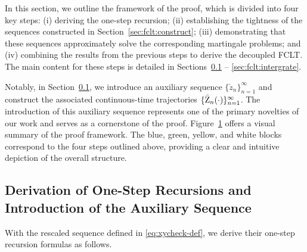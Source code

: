 \documentclass[11pt]{article}
\theoremstyle{plain}
\theoremstyle{definition}
\def\Figref#1{Figure~\ref{#1}}
\newcommand{\zcheck}{{\check{z}}}
\newcommand{\zbar}{{\bar{\textnormal{Z}}}}
\begin{document}
In this section, we outline the framework of the proof, which is divided into four key steps: (i) deriving the one-step recursion; (ii) establishing the tightness of the sequences constructed in Section~\ref{sec:fclt:construct}; (iii) demonstrating that these sequences approximately solve the corresponding martingale problems; and (iv) combining the results from the previous steps to derive the decoupled FCLT.
The main content for these steps is detailed in Sections~\ref{sec:fclt:one-step} -- \ref{sec:fclt:intergrate}. 

Notably, in Section~\ref{sec:fclt:one-step}, we introduce an auxiliary sequence $\{ \zcheck_{n} \}_{n=1}^\infty$ and construct the associated continuous-time trajectories $\{ \zbar_{n}(\cdot) \}_{n=1}^\infty$. The introduction of this auxiliary sequence represents one of the primary novelties of our work and serves as a cornerstone of the proof. \Figref{fig:proof-sketch} offers a visual summary of the proof framework. The blue, green, yellow, and white blocks correspond to the four steps outlined above, providing a clear and intuitive depiction of the overall structure.


\begin{figure}[omitted: a diagram of this paper's results, not reproduced here]\label{fig:proof-sketch}\end{figure}



\subsection{Derivation of One-Step Recursions and Introduction of the Auxiliary Sequence}
\label{sec:fclt:one-step}

With the rescaled sequence defined in \eqref{eq:xycheck-def}, we derive their one-step recursion formulas as follows.
\end{document}
